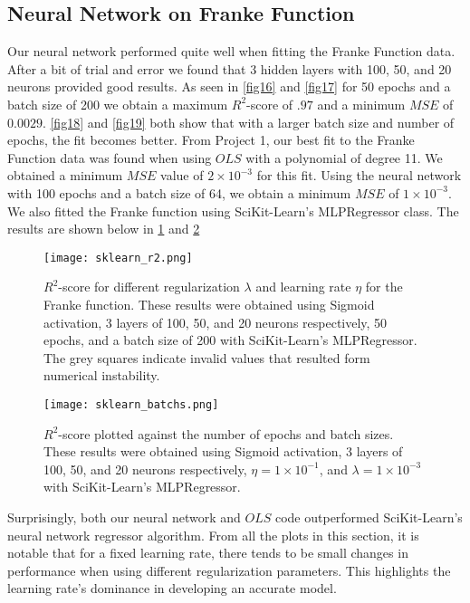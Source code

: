 \documentclass{emulateapj}
\begin{document}
\subsection{Neural Network on Franke Function}
Our neural network performed quite well when fitting the Franke Function data. After a bit of trial and error we found that 3 hidden layers with 100, 50, and 20 neurons provided good results. As seen in \ref{fig16} and \ref{fig17} for 50 epochs and a batch size of 200 we obtain a maximum $R^2$-score of $.97$ and a minimum $MSE$ of $0.0029$. \ref{fig18} and \ref{fig19} both show that with a larger batch size and number of epochs, the fit becomes better. From Project 1, our best fit to the Franke Function data was found when using $OLS$ with a polynomial of degree 11. We obtained a minimum $MSE$ value of $2\times10^{-3}$ for this fit. Using the neural network with 100 epochs and a batch size of 64, we obtain a minimum $MSE$ of $1\times10^{-3}$. We also fitted the Franke function using SciKit-Learn's MLPRegressor class. The results are shown below in \ref{fig22} and \ref{fig23}

\begin{figure}[h]
    \centering
    \texttt{[image: sklearn\_r2.png]}
    \caption{$R^2$-score for different regularization $\lambda$ and learning rate $\eta$ for the Franke function. These results were obtained using Sigmoid activation, 3 layers of 100, 50, and 20 neurons respectively, 50 epochs, and a batch size of 200 with SciKit-Learn's MLPRegressor. The grey squares indicate invalid values that resulted form numerical instability.}
    \label{fig22}
\end{figure}

\begin{figure}[h!]
    \centering
    \texttt{[image: sklearn\_batchs.png]}
    \caption{$R^2$-score plotted against the number of epochs and batch sizes. These results were obtained using Sigmoid activation, 3 layers of 100, 50, and 20 neurons respectively, $\eta = 1\times 10^{-1}$, and $\lambda = 1\times 10^{-3}$  with SciKit-Learn's MLPRegressor.}
    \label{fig23}
\end{figure}

Surprisingly, both our neural network and $OLS$ code outperformed SciKit-Learn's neural network regressor algorithm. From all the plots in this section, it is notable that for a fixed learning rate, there tends to be small changes in performance when using different regularization parameters. This highlights the learning rate's dominance in developing an accurate model.
\end{document}
